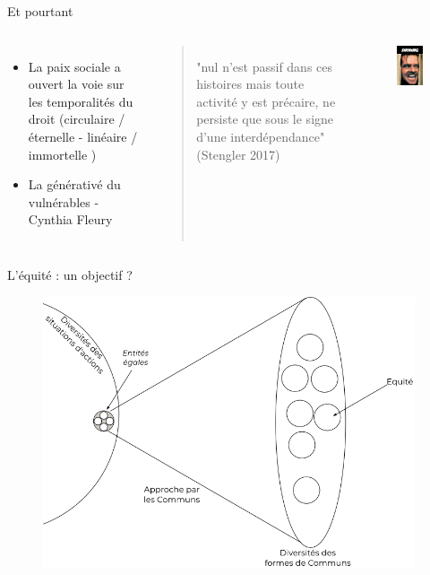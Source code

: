 \documentclass[newPxFont]{beamer}
\begin{document}
\begin{frame}[c]{Et pourtant}
  \vspace{-1cm}
  \begin{columns}[onlytextwidth,T]
    \column{\dimexpr\linewidth-30mm-5mm}
    \begin{itemize}
        \item La paix sociale a ouvert la voie sur les temporalités du droit (circulaire / éternelle - linéaire / immortelle )
        \item La générativé du vulnérables - Cynthia Fleury
    \end{itemize}
    \vspace{1cm}
    \begin{quotation}
      "nul n'est passif dans ces histoires mais toute activité y est précaire, ne persiste que sous le signe d'une interdépendance" (Stengler 2017)
    \end{quotation}
    \column{30mm}
    \begin{figure}
      \includegraphics[width=4cm]{img/shining.jpg}
    \end{figure}
  \end{columns}
  
\end{frame}

\begin{frame}[c]{L'équité : un objectif ?}
  \vspace{-1cm}
  
  
  \begin{figure}
    \includegraphics[height=8cm]{img/commun_egalite_equite.png}
  \end{figure}
  
  
  \end{frame}
\end{document}
